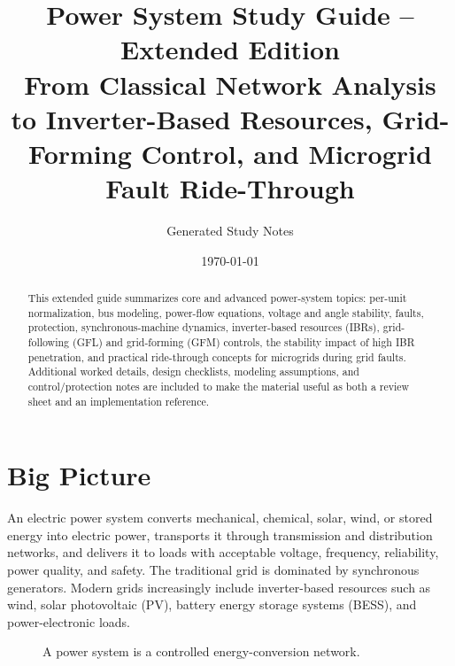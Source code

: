 \documentclass[11pt]{article}
\title{\textbf{Power System Study Guide -- Extended Edition}\\
\large From Classical Network Analysis to Inverter-Based Resources, Grid-Forming Control, and Microgrid Fault Ride-Through}
\author{Generated Study Notes}
\date{\today}
\begin{document}
\maketitle

\begin{abstract}
This extended guide summarizes core and advanced power-system topics: per-unit
normalization, bus modeling, power-flow equations, voltage and angle stability,
faults, protection, synchronous-machine dynamics, inverter-based resources
(IBRs), grid-following (GFL) and grid-forming (GFM) controls, the stability
impact of high IBR penetration, and practical ride-through concepts for
microgrids during grid faults. Additional worked details, design checklists,
modeling assumptions, and control/protection notes are included to make the
material useful as both a review sheet and an implementation reference.
\end{abstract}

\tableofcontents
\newpage

\section{Big Picture}

An electric power system converts mechanical, chemical, solar, wind, or stored
energy into electric power, transports it through transmission and distribution
networks, and delivers it to loads with acceptable voltage, frequency,
reliability, power quality, and safety. The traditional grid is dominated by
synchronous generators. Modern grids increasingly include inverter-based
resources such as wind, solar photovoltaic (PV), battery energy storage systems
(BESS), and power-electronic loads.

\begin{figure}[h]
\centering
{}
\caption{A power system is a controlled energy-conversion network.}
\end{figure}
\end{document}
